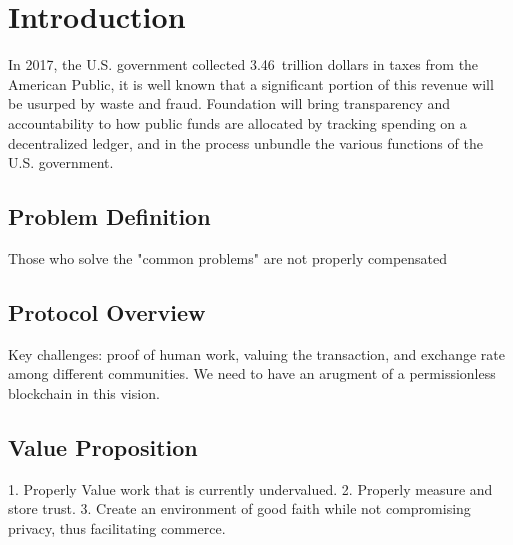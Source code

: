 \section{\textbf{Introduction}}

In 2017, the U.S. government collected 3.46 trillion dollars in taxes from the American Public, it is well known that a significant portion of this revenue will be usurped by waste and fraud. Foundation will bring transparency and accountability to how public funds are allocated by tracking spending on a decentralized ledger, and in the process unbundle the various functions of the U.S. government.






\subsection{Problem Definition}

Those who solve the "common problems" are not properly compensated

\subsection{Protocol Overview}

Key challenges: proof of human work, valuing the transaction, and exchange rate among different communities. We need to have an arugment of a permissionless blockchain in this vision. 

\subsection{Value Proposition}

1. Properly Value work that is currently undervalued. 2. Properly measure and store trust. 3. Create an environment of good faith while not compromising privacy, thus facilitating commerce. 

